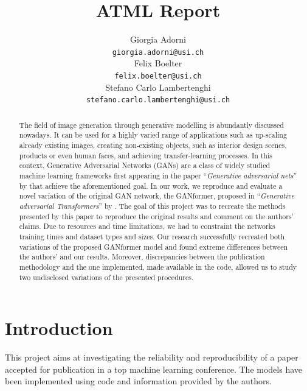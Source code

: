\documentclass{article}
\title{ATML Report}
\author{%
	Giorgia Adorni \\
	\texttt{giorgia.adorni@usi.ch} \\
	\And
	Felix Boelter\\
	\texttt{felix.boelter@usi.ch}\\
	\And
	Stefano Carlo Lambertenghi\\
	\texttt{stefano.carlo.lambertenghi@usi.ch}\\
}
\begin{document}
	
	\maketitle
	\begin{abstract}
		The field of image generation through generative modelling is abundantly discussed nowadays. It 
		can be used for a highly varied range of applications such as up-scaling 
		already existing images, creating non-existing objects, such as interior design scenes,
		products or even human faces, and achieving transfer-learning processes. 
		In this context, Generative Adversarial Networks (GANs) are a class of widely studied machine 
		learning frameworks first appearing in the paper ``\emph{Generative adversarial nets}'' by 
		\citet{goodfellow2014generative} that achieve the aforementioned goal. 
		In our work, we reproduce and evaluate a novel variation of the original GAN network, the 
		GANformer, proposed in ``\emph{Generative adversarial Transformers}'' by 
		\citet{hudson2021generative}. 
		The goal of this project was to recreate the methods presented by this paper to reproduce the 
		original results and comment on the authors’ claims. 
		Due to resources and time limitations, we had to constraint the networks training times and 
		dataset types and sizes. 
		Our research successfully recreated both variations of the proposed GANformer model and found 
		extreme differences between the authors’ and our results. 
		Moreover, discrepancies between the publication methodology and the one implemented, 
		made available in the code, allowed us to study two undisclosed variations of the presented 
		procedures.
	\end{abstract}
	
	\section{Introduction}
	This project aims at investigating the reliability and reproducibility of a paper accepted 
	for publication in a top machine learning conference. The models have been implemented 
	using code and information provided by the authors.
	
\end{document}
